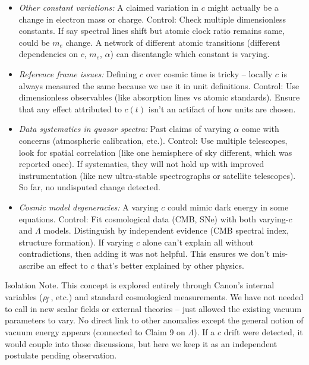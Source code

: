 \documentclass[11pt]{article}
\begin{document}
\begin{itemize}

\item 
\textit{Other constant variations:} A claimed variation in $c$ might actually be a change in electron mass or charge. Control: Check multiple dimensionless constants. If say spectral lines shift but atomic clock ratio remains same, could be $m_e$ change. A network of different atomic transitions (different dependencies on $c$, $m_e$, $\alpha$) can disentangle which constant is varying.




\item 
\textit{Reference frame issues:} Defining $c$ over cosmic time is tricky – locally $c$ is always measured the same because we use it in unit definitions. Control: Use dimensionless observables (like absorption lines vs atomic standards). Ensure that any effect attributed to $c(t)$ isn’t an artifact of how units are chosen.




\item 
\textit{Data systematics in quasar spectra:} Past claims of varying $\alpha$ come with concerns (atmospheric calibration, etc.). Control: Use multiple telescopes, look for spatial correlation (like one hemisphere of sky different, which was reported once). If systematics, they will not hold up with improved instrumentation (like new ultra-stable spectrographs or satellite telescopes). So far, no undisputed change detected.




\item 
\textit{Cosmic model degeneracies:} A varying $c$ could mimic dark energy in some equations. Control: Fit cosmological data (CMB, SNe) with both varying-$c$ and $\Lambda$ models. Distinguish by independent evidence (CMB spectral index, structure formation). If varying $c$ alone can’t explain all without contradictions, then adding it was not helpful. This ensures we don’t mis-ascribe an effect to $c$ that’s better explained by other physics.




\end{itemize}

Isolation Note. This concept is explored entirely through Canon’s internal variables ($\rho_{\!f}$, etc.) and standard cosmological measurements. We have not needed to call in new scalar fields or external theories – just allowed the existing vacuum parameters to vary. No direct link to other anomalies except the general notion of vacuum energy appears (connected to Claim 9 on $\Lambda$). If a $c$ drift were detected, it would couple into those discussions, but here we keep it as an independent postulate pending observation.
\end{document}

